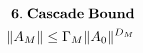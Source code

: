 \documentclass[preview]{standalone}
\begin{document}
\begin{align*}
\special{dvisvgm:raw <g id='unique000'>}\mathbf{6.\;Cascade\;Bound}\\\|A_M\|\le\Gamma_M\|A_0\|^{D_M}\special{dvisvgm:raw </g>}
\end{align*}
\end{document}
